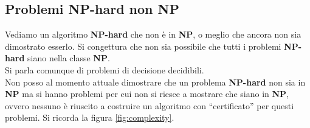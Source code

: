 \documentclass[a4paper,12pt, oneside]{book}
\begin{document}
\subsection{Problemi NP-hard non NP}
Vediamo un algoritmo \textbf{NP-hard} che non è in \textbf{NP}, o meglio che
ancora non sia dimostrato esserlo.
Si congettura che non sia possibile che tutti i problemi \textbf{NP-hard} siano
nella classe \textbf{NP}.\\ 
Si parla comunque di problemi di decisione decidibili.\\
Non posso al momento attuale dimostrare che un problema \textbf{NP-hard} non sia
in \textbf{NP} ma si hanno problemi per cui non si riesce a mostrare che siano
in \textbf{NP}, ovvero nessuno è riuscito a costruire un algoritmo con
``certificato'' per questi problemi. Si ricorda la figura
\ref{fig:complexity}.
\end{document}
